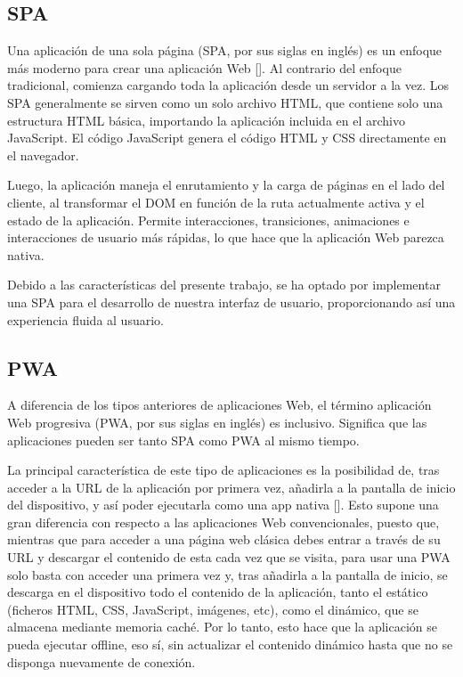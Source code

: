 \subsection{SPA}
Una aplicación de una sola página (SPA, por sus siglas en inglés) es un enfoque más moderno para crear una aplicación Web [\cite{101}]. Al contrario del enfoque tradicional, comienza cargando toda la aplicación desde un servidor a la vez. Los SPA generalmente se sirven como un solo archivo HTML, que contiene solo una estructura HTML básica, importando la aplicación incluida en el archivo JavaScript. El código JavaScript genera el código HTML y CSS directamente en el navegador.

Luego, la aplicación maneja el enrutamiento y la carga de páginas en el lado del cliente, al transformar el DOM en función de la ruta actualmente activa y el estado de la aplicación. Permite interacciones, transiciones, animaciones e interacciones de usuario más rápidas, lo que hace que la aplicación Web parezca nativa.

Debido a las características del presente trabajo, se ha optado por implementar una SPA para el desarrollo de nuestra interfaz de usuario, proporcionando así una experiencia fluida al usuario. %

\subsection{PWA}
A diferencia de los tipos anteriores de aplicaciones Web, el término aplicación Web progresiva (PWA, por sus siglas en inglés) es inclusivo. Significa que las aplicaciones pueden ser tanto SPA como PWA al mismo tiempo.

La principal característica de este tipo de aplicaciones es la posibilidad de, tras acceder a la URL de la aplicación por primera vez, añadirla a la pantalla de inicio del dispositivo, y así poder ejecutarla como una app nativa [\cite{102}]. Esto supone una gran diferencia con respecto a las aplicaciones Web convencionales, puesto que, mientras que para acceder a una página web clásica debes entrar a través de su URL y descargar el contenido de esta cada vez que se visita, para usar una PWA solo basta con acceder una primera vez y, tras añadirla a la pantalla de inicio, se descarga en el dispositivo todo el contenido de la aplicación, tanto el estático (ficheros HTML, CSS, JavaScript, imágenes, etc), como el dinámico, que se almacena mediante memoria caché. Por lo tanto, esto hace que la aplicación se pueda ejecutar offline, eso sí, sin actualizar el contenido dinámico hasta que no se disponga nuevamente de conexión.

